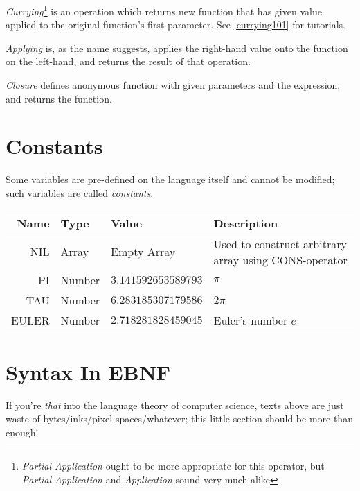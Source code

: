 \emph{Currying}\footnote{\emph{Partial Application} ought to be more appropriate for this operator, but \emph{Partial Application} and \emph{Application} sound very much alike} is an operation which returns new function that has given value applied to the original function's first parameter. See \ref{currying101} for tutorials.

\emph{Applying} is, as the name suggests, applies the right-hand value onto the function on the left-hand, and returns the result of that operation.

\emph{Closure} defines anonymous function with given parameters and the expression, and returns the function.

\section{Constants}

Some variables are pre-defined on the language itself and cannot be modified; such variables are called \emph{constants}.

\begin{tabulary}{\textwidth}{rllL}
Name & Type & Value & Description \\
\hline
NIL & Array & Empty Array & Used to construct arbitrary array using CONS-operator \\
PI & Number & $3.141592653589793$ & $\pi$ \\
TAU & Number & $6.283185307179586$ & $2 \pi$ \\
EULER & Number & $2.718281828459045$ & Euler's number $e$ \\
\end{tabulary}

\section{Syntax In EBNF}

If you're \emph{that} into the language theory of computer science, texts above are just waste of bytes/inks/pixel-spaces/whatever; this little section should be more than enough!



